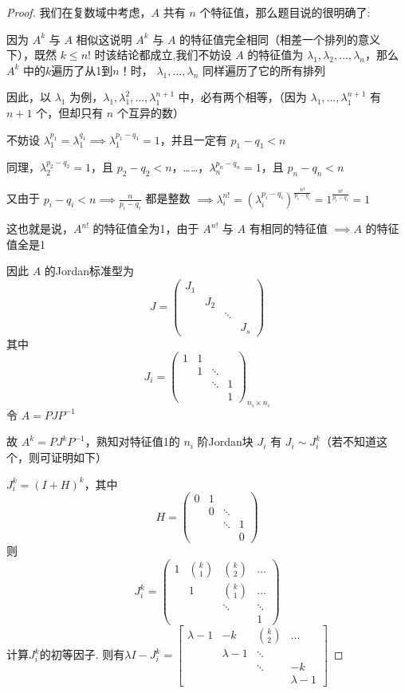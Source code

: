 \documentclass[12pt]{ctexart}  %
\begin{document}
\begin{proof}
我们在复数域中考虑，$A$ 共有 $n$ 个特征值，那么题目说的很明确了:
\par 因为 $A^k$ 与 $A$ 相似这说明 $A^k$ 与 $A$ 的特征值完全相同（相差一个排列的意义下），既然 $k \leq n!$ 时该结论都成立,我们不妨设 $A$ 的特征值为 
$\lambda_1, \lambda_2, \dots, \lambda_n$，那么 $A^k$ 中的$k$遍历了从1到$n！$时， $\lambda_1, \dots, \lambda_n$ 同样遍历了它的所有排列

因此，以 $\lambda_1$ 为例，$\lambda_1, \lambda_1^2, \dots, \lambda_1^{n+1}$ 中，必有两个相等，（因为 $\lambda_1, \dots, \lambda_1^{n+1}$ 有 $n+1$ 个，但却只有 $n$ 个互异的数）

不妨设 $\lambda_1^{p_1} = \lambda_1^{q_1} \implies \lambda_1^{p_1 - q_1} = 1$，并且一定有 $p_1 - q_1 < n$

同理，$\lambda_2^{p_2 - q_2} = 1$，且 $p_2 - q_2 < n$，……，$\lambda_n^{p_n - q_n} = 1$，且 $p_n - q_n < n$

又由于 $p_i - q_i < n \implies \frac{n}{p_i - q_i}$ 都是整数 $\implies \lambda_i^{n!} = (\lambda_i^{p_i - q_i})^{\frac{n!}{p_i - q_i}} = 1^{\frac{n!}{p_i - q_i}} = 1$

这也就是说，$A^{n!}$ 的特征值全为1，由于 $A^{n!}$ 与 $A$ 有相同的特征值 $\implies A$ 的特征值全是1

因此 $A$ 的Jordan标准型为
\[
J = \begin{pmatrix}
J_1 & & & \\
& J_2 & & \\
& & \ddots & \\
& & & J_s
\end{pmatrix}
\]
其中
\[
J_i = \begin{pmatrix}
1 & 1 & & \\
& 1 & \ddots & \\
& & \ddots & 1 \\
& & & 1
\end{pmatrix}_{n_i \times n_i}
\]
令 $A = PJP^{-1}$

故 $A^k = PJ^kP^{-1}$，熟知对特征值1的 $n_i$ 阶Jordan块 $J_i$ 有 $J_i \sim J_i^k$（若不知道这个，则可证明如下）

$J_i^k = (I + H)^k$，其中
\[
H = \begin{pmatrix}
0 & 1 & & \\
& 0 & \ddots & \\
& & \ddots & 1 \\
& & & 0
\end{pmatrix}
\]
则
\[
J_i^k = \begin{pmatrix}
1 & \binom{k}{1} & \binom{k}{2} & \dots \\
& 1 & \binom{k}{1} & \dots \\
& & \ddots & \ddots \\
& & & 1
\end{pmatrix}
\]
计算$J_i^k$的初等因子. 则有$\lambda I-J_i^k=
\begin{bmatrix}
\lambda-1 & -k & \binom{k}{2}& \dots\\
& \lambda-1 & \ddots & \\
& & \ddots & -k \\
& & & \lambda-1
\end{bmatrix}$


\end{proof}
\end{document}
